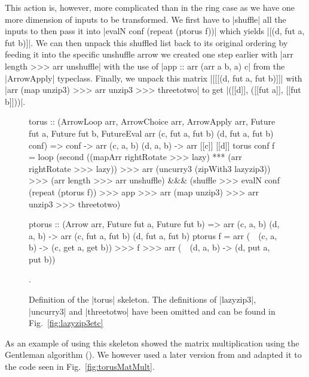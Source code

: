 This action is, however,  more complicated than in the ring case as we have one more dimension of inputs to be transformed. We first have to |shuffle| all the inputs to then pass it into |evalN conf (repeat (ptorus f))| which yields |[(d, fut a, fut b)]|. We can then unpack this shuffled list back to its original ordering by feeding it into the specific unshuffle arrow we created one step earlier with |arr length >>> arr unshuffle| with the use of |app :: arr (arr a b, a) c| from the |ArrowApply| typeclass. Finally, we unpack this matrix |[[[(d, fut a, fut b)]]| with |arr (map unzip3) >>> arr unzip3 >>> threetotwo| to get  |([[d]], ([[fut a]], [[fut b]]))|.

\begin{figure}[tb]
\begin{code}
torus :: (ArrowLoop arr, ArrowChoice arr, ArrowApply arr, Future fut a, Future fut b,
          FutureEval arr (c, fut a, fut b) (d, fut a, fut b) conf) =>
	conf -> arr (c, a, b) (d, a, b) -> arr [[c]] [[d]]
torus conf f =
	loop (second ((mapArr rightRotate >>> lazy) *** (arr rightRotate >>> lazy)) >>>
	arr (uncurry3 (zipWith3 lazyzip3)) >>>
	(arr length >>> arr unshuffle) &&& (shuffle >>> evalN conf (repeat (ptorus f)) >>> app >>>
	arr (map unzip3) >>> arr unzip3 >>> threetotwo)

ptorus :: (Arrow arr, Future fut a, Future fut b) =>
	arr (c, a, b) (d, a, b) -> arr (c, fut a, fut b) (d, fut a, fut b)
ptorus f = arr (\ ~(c, a, b) -> (c, get a, get b)) >>> f >>> arr (\ ~(d, a, b) -> (d, put a, put b))
\end{code} %
\caption{Definition of the |torus| skeleton. The definitions of |lazyzip3|, |uncurry3| and |threetotwo| have been omitted and can be found in Fig.~\ref{fig:lazyzip3etc}}.
\label{fig:torus}
\end{figure}
As an example of using this skeleton \citep{Loogen2012} showed the matrix multiplication using the Gentleman algorithm (\citeyear{Gentleman1978}). We however used a later version from  \citep{Eden:SkeletonBookChapter02} and adapted it to the code seen in Fig.~\ref{fig:torusMatMult}.
